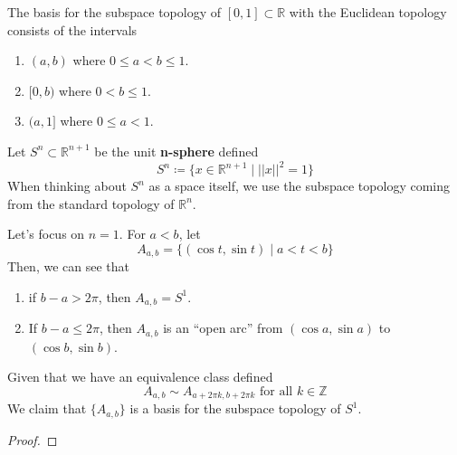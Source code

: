     \begin{example}
      The basis for the subspace topology of $[0, 1] \subset \mathbb{R}$ with the Euclidean topology consists of the intervals 
      \begin{enumerate}
        \item $(a, b)$ where $0 \leq a < b \leq 1$. 
        \item $[0, b)$ where $0 < b \leq 1$. 
        \item $(a, 1]$ where $0 \leq a < 1$. 
      \end{enumerate}
    \end{example} 

    \begin{example}
      Let $S^n \subset \mathbb{R}^{n+1}$ be the unit \textbf{n-sphere} defined 
      \begin{equation}
        S^n \coloneqq \{x \in \mathbb{R}^{n+1} \mid ||x||^2 = 1 \}
      \end{equation}
      When thinking about $S^n$ as a space itself, we use the subspace topology coming from the standard topology of $\mathbb{R}^n$. 
    \end{example}

    Let's focus on $n = 1$. For $a < b$, let 
    \begin{equation}
      A_{a, b} = \{ (\cos{t}, \sin{t}) \mid a < t < b \}
    \end{equation} 
    Then, we can see that
    \begin{enumerate}
      \item if $b - a > 2 \pi$, then $A_{a, b} = S^1$. 
      \item If $b - a \leq 2 \pi$, then $A_{a, b}$ is an ``open arc'' from $(\cos{a}, \sin{a})$ to $(\cos{b}, \sin{b})$.  
    \end{enumerate} 

    \begin{theorem}
      Given that we have an equivalence class defined 
      \begin{equation}
        A_{a, b} \sim A_{a + 2 \pi k, b + 2 \pi k} \text{ for all } k \in \mathbb{Z}
      \end{equation} 
      We claim that $\{A_{a, b}\}$ is a basis for the subspace topology of $S^1$. 
    \end{theorem} 
    \begin{proof}
      
    \end{proof}

